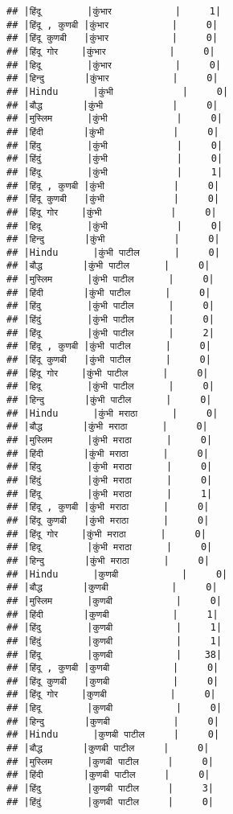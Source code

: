 \documentclass[
]{article}
\begin{document}
\begin{verbatim}
## |हिंदू        |कुंभार           |     1|
## |हिंदू , कुणबी |कुंभार           |     0|
## |हिंदू कुणबी   |कुंभार           |     0|
## |हिंदू गोर    |कुंभार           |     0|
## |हिदू        |कुंभार           |     0|
## |हिन्दु       |कुंभार           |     0|
## |Hindu      |कुंभी            |     0|
## |बौद्ध       |कुंभी            |     0|
## |मुस्लिम      |कुंभी            |     0|
## |हिंदी       |कुंभी            |     0|
## |हिंदु        |कुंभी            |     0|
## |हिंदुं        |कुंभी            |     0|
## |हिंदू        |कुंभी            |     1|
## |हिंदू , कुणबी |कुंभी            |     0|
## |हिंदू कुणबी   |कुंभी            |     0|
## |हिंदू गोर    |कुंभी            |     0|
## |हिदू        |कुंभी            |     0|
## |हिन्दु       |कुंभी            |     0|
## |Hindu      |कुंभी पाटील      |     0|
## |बौद्ध       |कुंभी पाटील      |     0|
## |मुस्लिम      |कुंभी पाटील      |     0|
## |हिंदी       |कुंभी पाटील      |     0|
## |हिंदु        |कुंभी पाटील      |     0|
## |हिंदुं        |कुंभी पाटील      |     0|
## |हिंदू        |कुंभी पाटील      |     2|
## |हिंदू , कुणबी |कुंभी पाटील      |     0|
## |हिंदू कुणबी   |कुंभी पाटील      |     0|
## |हिंदू गोर    |कुंभी पाटील      |     0|
## |हिदू        |कुंभी पाटील      |     0|
## |हिन्दु       |कुंभी पाटील      |     0|
## |Hindu      |कुंभी मराठा      |     0|
## |बौद्ध       |कुंभी मराठा      |     0|
## |मुस्लिम      |कुंभी मराठा      |     0|
## |हिंदी       |कुंभी मराठा      |     0|
## |हिंदु        |कुंभी मराठा      |     0|
## |हिंदुं        |कुंभी मराठा      |     0|
## |हिंदू        |कुंभी मराठा      |     1|
## |हिंदू , कुणबी |कुंभी मराठा      |     0|
## |हिंदू कुणबी   |कुंभी मराठा      |     0|
## |हिंदू गोर    |कुंभी मराठा      |     0|
## |हिदू        |कुंभी मराठा      |     0|
## |हिन्दु       |कुंभी मराठा      |     0|
## |Hindu      |कुणबी           |     0|
## |बौद्ध       |कुणबी           |     0|
## |मुस्लिम      |कुणबी           |     0|
## |हिंदी       |कुणबी           |     1|
## |हिंदु        |कुणबी           |     1|
## |हिंदुं        |कुणबी           |     1|
## |हिंदू        |कुणबी           |    38|
## |हिंदू , कुणबी |कुणबी           |     0|
## |हिंदू कुणबी   |कुणबी           |     0|
## |हिंदू गोर    |कुणबी           |     0|
## |हिदू        |कुणबी           |     0|
## |हिन्दु       |कुणबी           |     0|
## |Hindu      |कुणबी पाटील     |     0|
## |बौद्ध       |कुणबी पाटील     |     0|
## |मुस्लिम      |कुणबी पाटील     |     0|
## |हिंदी       |कुणबी पाटील     |     0|
## |हिंदु        |कुणबी पाटील     |     3|
## |हिंदुं        |कुणबी पाटील     |     0|

\end{verbatim}
\end{document}
